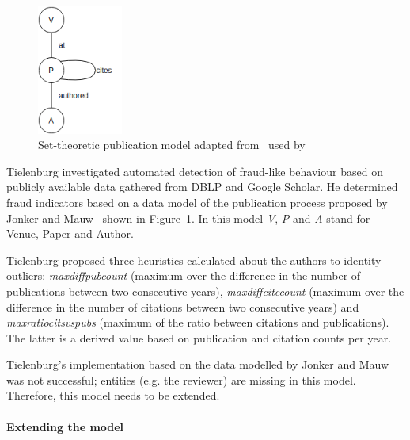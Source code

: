 \documentclass{ou-report}
\newcommand{\todo}[1]{{\color{red} TODO: #1}}
\begin{document}
\begin{figure}
    \centering
    \includegraphics[width=0.25\textwidth]{images/jm2017_undiced_pub_view.drawio.png}
    \caption{Set-theoretic publication model adapted from~\cite{JM2017} used 
by~\cite{TEJ2017}}
    \label{fig:rw_jm2017}
\end{figure}

Tielenburg investigated automated detection of fraud-like behaviour based on
publicly available data ga\-thered from DBLP and Google Scholar. He determined 
fraud indicators based on a data model of the publication process proposed by 
Jonker and Mauw~\cite{JM2017} shown in Figure~\ref{fig:rw_jm2017}. In this 
model \textit{V}, \textit{P} and \textit{A} stand for Venue, Paper and Author.




Tielenburg proposed three heuristics calculated about the authors to identity 
outliers: 
\textit{maxdiffpubcount} (maximum over the difference in the number of 
publications between two consecutive years), \textit{maxdiffcitecount} (maximum 
over the difference in the number of citations between two consecutive years) 
and \textit{maxratiocitsvspubs} (maximum of the ratio between citations and 
publications). The latter is a derived value based on publication 
and citation counts per year.

Tielenburg's implementation based on the data modelled by Jonker and Mauw was 
not successful; entities (e.g. the reviewer) are missing in this model. 
Therefore, this model needs to be extended.

\paragraph{Extending the model}
\end{document}
